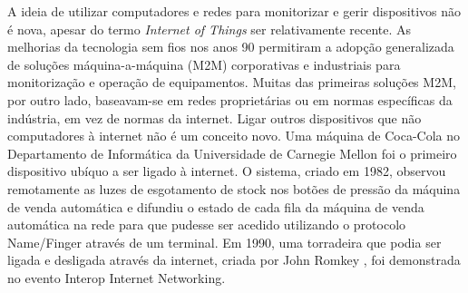 \documentclass[conference]{IEEEtran}
\begin{document}

A ideia de utilizar computadores e redes para monitorizar e gerir dispositivos
não é nova, apesar do termo \textit{Internet of Things} ser relativamente
recente. As melhorias da tecnologia sem fios nos anos 90 permitiram a adopção
generalizada de soluções máquina-a-máquina (M2M) corporativas e industriais
para monitorização e operação de equipamentos. Muitas das primeiras soluções
M2M, por outro lado, baseavam-se em redes proprietárias ou em normas específicas
da indústria, em vez de normas da internet. Ligar outros dispositivos que
não computadores à internet não é um conceito novo. Uma máquina de Coca-Cola
no Departamento de Informática da Universidade de Carnegie Mellon \cite{EverhartInteresting}
foi o primeiro dispositivo ubíquo a ser ligado à internet. O sistema, criado
em 1982, observou remotamente as luzes de esgotamento de stock nos botões
de pressão da máquina de venda automática e difundiu o estado de cada fila
da máquina de venda automática na rede para que pudesse ser acedido utilizando
o protocolo Name/Finger através de um terminal. Em 1990, uma torradeira que
podia ser ligada e desligada através da internet, criada por John Romkey \cite{RomkeyToast},
foi demonstrada no evento Interop Internet Networking.
\end{document}
